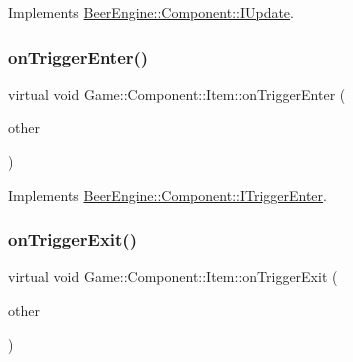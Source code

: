 Implements \mbox{\hyperlink{class_beer_engine_1_1_component_1_1_i_update_a615c127a4729f73713e5eaeee538854b}{Beer\+Engine\+::\+Component\+::\+I\+Update}}.

\mbox{\label{class_game_1_1_component_1_1_item_ae5369b261c5d6212de4b3f21ce02c672}} 
\subsubsection{\texorpdfstring{on\+Trigger\+Enter()}{onTriggerEnter()}}
{\footnotesize\ttfamily virtual void Game\+::\+Component\+::\+Item\+::on\+Trigger\+Enter (\begin{DoxyParamCaption}\item[{\mbox{\hyperlink{class_beer_engine_1_1_component_1_1_a_collider}{Beer\+Engine\+::\+Component\+::\+A\+Collider}} $\ast$}]{other }\end{DoxyParamCaption})\hspace{0.3cm}{\ttfamily [virtual]}}



Implements \mbox{\hyperlink{class_beer_engine_1_1_component_1_1_i_trigger_enter_aab0d007cc2a256bc5aa542cd7dfdeef0}{Beer\+Engine\+::\+Component\+::\+I\+Trigger\+Enter}}.

\mbox{\label{class_game_1_1_component_1_1_item_a33c72fb48b46ce7b67b924472d0f3456}} 
\subsubsection{\texorpdfstring{on\+Trigger\+Exit()}{onTriggerExit()}}
{\footnotesize\ttfamily virtual void Game\+::\+Component\+::\+Item\+::on\+Trigger\+Exit (\begin{DoxyParamCaption}\item[{\mbox{\hyperlink{class_beer_engine_1_1_component_1_1_a_collider}{Beer\+Engine\+::\+Component\+::\+A\+Collider}} $\ast$}]{other }\end{DoxyParamCaption})\hspace{0.3cm}{\ttfamily [virtual]}}



